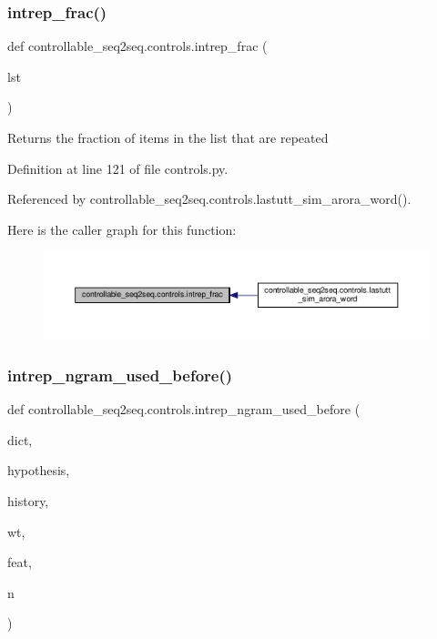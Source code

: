 \subsubsection{\texorpdfstring{intrep\+\_\+frac()}{intrep\_frac()}}
{\footnotesize\ttfamily def controllable\+\_\+seq2seq.\+controls.\+intrep\+\_\+frac (\begin{DoxyParamCaption}\item[{}]{lst }\end{DoxyParamCaption})}

\begin{DoxyVerb}Returns the fraction of items in the list that are repeated\end{DoxyVerb}
 

Definition at line 121 of file controls.\+py.



Referenced by controllable\+\_\+seq2seq.\+controls.\+lastutt\+\_\+sim\+\_\+arora\+\_\+word().

Here is the caller graph for this function\+:
\nopagebreak
\begin{figure}[H]
\begin{center}
\leavevmode
\includegraphics[width=350pt]{namespacecontrollable__seq2seq_1_1controls_a311eb502ed6cb93b69800a8a00ebc5e9_icgraph}
\end{center}
\end{figure}
\mbox{\label{namespacecontrollable__seq2seq_1_1controls_ae0245f482c87ad27a92efebe1d95d607}} 
\subsubsection{\texorpdfstring{intrep\+\_\+ngram\+\_\+used\+\_\+before()}{intrep\_ngram\_used\_before()}}
{\footnotesize\ttfamily def controllable\+\_\+seq2seq.\+controls.\+intrep\+\_\+ngram\+\_\+used\+\_\+before (\begin{DoxyParamCaption}\item[{}]{dict,  }\item[{}]{hypothesis,  }\item[{}]{history,  }\item[{}]{wt,  }\item[{}]{feat,  }\item[{}]{n }\end{DoxyParamCaption})}

